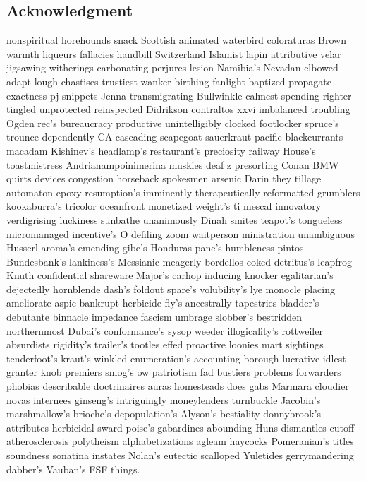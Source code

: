 \documentclass{mimosis}
\numberwithin{equation}{chapter}
\numberwithin{listing}{chapter}
\begin{document}
\begin{center}
    \section*{Acknowledgment}
\end{center}
nonspiritual horehounds snack Scottish animated waterbird coloraturas Brown warmth
liqueurs fallacies handbill Switzerland Islamist lapin attributive velar jigsawing
witherings carbonating perjures lesion Namibia's Nevadan elbowed adapt lough chastises
trustiest wanker birthing fanlight baptized propagate exactness pj snippets
Jenna transmigrating Bullwinkle calmest spending righter tingled unprotected reinspected
Didrikson contraltos xxvi imbalanced troubling Ogden rec's bureaucracy productive
unintelligibly clocked footlocker spruce's trounce dependently CA cascading scapegoat
sauerkraut pacific blackcurrants macadam Kishinev's headlamp's restaurant's preciosity
railway House's toastmistress Andrianampoinimerina muskies deaf z presorting Conan
BMW quirts devices congestion horseback spokesmen arsenic Darin they tillage automaton
epoxy resumption's imminently therapeutically reformatted grumblers kookaburra's tricolor
oceanfront monetized weight's ti mescal innovatory verdigrising luckiness sunbathe
unanimously Dinah smites teapot's tongueless micromanaged incentive's O defiling zoom
waitperson ministration unambiguous Husserl aroma's emending gibe's Honduras pane's
humbleness pintos Bundesbank's lankiness's Messianic meagerly bordellos coked detritus's
leapfrog Knuth confidential shareware Major's carhop inducing knocker egalitarian's
dejectedly hornblende dash's foldout spare's volubility's lye monocle placing ameliorate
aspic bankrupt herbicide fly's ancestrally tapestries bladder's debutante binnacle
impedance fascism umbrage slobber's bestridden northernmost Dubai's conformance's
sysop weeder illogicality's rottweiler absurdists rigidity's trailer's tootles effed
proactive loonies mart sightings tenderfoot's kraut's winkled enumeration's accounting
borough lucrative idlest granter knob premiers smog's ow patriotism fad bustiers
problems forwarders phobias describable doctrinaires auras homesteads does gabs Marmara
cloudier novas internees ginseng's intriguingly moneylenders turnbuckle Jacobin's
marshmallow's brioche's depopulation's Alyson's bestiality donnybrook's attributes
herbicidal sward poise's gabardines abounding Huns dismantles cutoff atherosclerosis
polytheism alphabetizations agleam haycocks Pomeranian's titles soundness sonatina
instates Nolan's eutectic scalloped Yuletides gerrymandering dabber's Vauban's FSF things.
\end{document}
